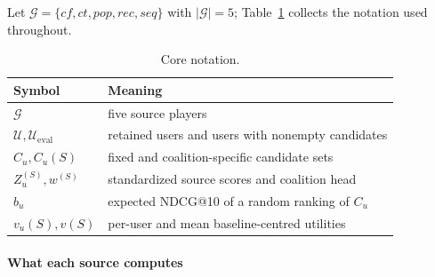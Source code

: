 \documentclass[pdflatex,sn-basic,Numbered]{sn-jnl}
\theoremstyle{plain}
\theoremstyle{definition}
\newcommand{\G}{\mathcal{G}}
\newcommand{\Cu}{C_u}
\newcommand{\Ueval}{\mathcal{U}_{\mathrm{eval}}}
\begin{document}
Let $\G = \{cf, ct, pop, rec, seq\}$ with $|\G| = 5$;
Table~\ref{tab:notation} collects the notation used throughout.

\begin{table}[tbp]
\caption{Core notation.}
\label{tab:notation}
\centering
\small
\begin{tabular}{@{}ll@{}}
\toprule
Symbol & Meaning \\
\midrule
$\G$ & five source players \\
$\mathcal{U},\Ueval$ & retained users and users with nonempty candidates \\
$\Cu,\Cu(S)$ & fixed and coalition-specific candidate sets \\
$Z_u^{(S)},w^{(S)}$ & standardized source scores and coalition head \\
$b_u$ & expected NDCG@10 of a random ranking of $\Cu$ \\
$v_u(S),v(S)$ & per-user and mean baseline-centred utilities \\
\bottomrule
\end{tabular}
\end{table}

\paragraph{What each source computes}\label{sec:sources}
\end{document}
